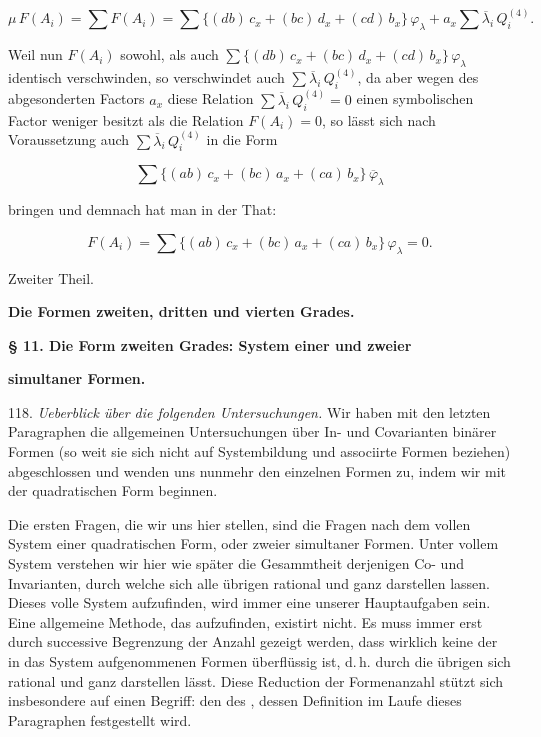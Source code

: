 \documentclass[11pt]{article}
\providecommand{\gesperrt}[1]{\textls[130]{#1}}
\providecommand{\weberpage}[1]{}
\begin{document}
\[
\mu\,F(A_i) = \sum F(A_i) = \sum \{(db)\,c_x + (bc)\,d_x + (cd)\,b_x\}\,\varphi_\lambda + a_x \sum \overline{\lambda}_i\,Q_i^{(4)}.
\]

Weil nun $F(A_i)$ sowohl, als auch $\sum \{(db)\,c_x + (bc)\,d_x + (cd)\,b_x\}\,\varphi_\lambda$
identisch verschwinden, so verschwindet auch $\sum \overline{\lambda}_i\,Q_i^{(4)}$,
da aber wegen des abgesonderten Factors $a_x$ diese Relation
$\sum \overline{\lambda}_i\,Q_i^{(4)} = 0$ einen symbolischen Factor weniger besitzt
als die Relation $F(A_i) = 0$, so lässt sich nach Voraussetzung auch
$\sum \overline{\lambda}_i\,Q_i^{(4)}$ in die Form

\[
\sum \{(ab)\,c_x + (bc)\,a_x + (ca)\,b_x\}\,\overline{\varphi}_\lambda
\]

bringen und demnach hat man in der That:

\[
F(A_i) = \sum \{(ab)\,c_x + (bc)\,a_x + (ca)\,b_x\}\,\varphi_\lambda = 0.
\]



\weberpage{135}

\begin{center}
Zweiter Theil.

\textbf{Die Formen zweiten, dritten und vierten Grades.}
\end{center}

\begin{center}
\textbf{§ 11. Die Form zweiten Grades: System einer und zweier}

\textbf{simultaner Formen.}
\end{center}

118. \textit{Ueberblick über die folgenden Untersuchungen.} Wir haben mit
den letzten Paragraphen die allgemeinen Untersuchungen über In- und
Covarianten binärer Formen (so weit sie sich nicht auf Systembildung
und associirte Formen beziehen) abgeschlossen und wenden uns nunmehr
den einzelnen Formen zu, indem wir mit der quadratischen Form
beginnen.

Die ersten Fragen, die wir uns hier stellen, sind die Fragen nach
dem vollen System einer quadratischen Form, oder zweier simultaner
Formen. Unter vollem System verstehen wir hier wie später die Gesammtheit
derjenigen Co- und Invarianten, durch welche sich alle übrigen
rational und ganz darstellen lassen. Dieses volle System aufzufinden,
wird immer eine unserer Hauptaufgaben sein. Eine allgemeine Methode,
das \gesperrt{kleinste volle System} aufzufinden, existirt nicht. Es muss immer
erst durch successive Begrenzung der Anzahl gezeigt werden, dass
wirklich keine der in das System aufgenommenen Formen überflüssig
ist, d.\,h. durch die übrigen sich rational und ganz darstellen lässt.
Diese Reduction der Formenanzahl stützt sich insbesondere auf einen
Begriff: den des \gesperrt{Reducenten}, dessen Definition im Laufe dieses
Paragraphen festgestellt wird.
\end{document}

